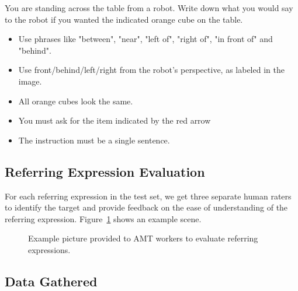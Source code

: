 \documentclass[letterpaper,10pt]{article}
\begin{document}
\begin{framed}
You are standing across the table from a robot. Write down what you would say to the robot if you wanted the indicated orange cube on the table.
\begin{itemize}[topsep=0pt,itemsep=-1ex,partopsep=1ex,parsep=1ex]
\item Use phrases like "between", "near", "left of", "right of", "in front of" and "behind".
\item Use front/behind/left/right from the robot's perspective, as labeled in the image. 
\item All orange cubes look the same.
\item You must ask for the item indicated by the red arrow
\item The instruction must be a single sentence.
\end{itemize}
\end{framed}

\subsection{Referring Expression Evaluation}

For each referring expression in the test set, we get three separate human raters to identify the target and provide feedback on the ease of understanding of the referring expression. Figure~\ref{fig:ref_expr_eval_pic} shows an example scene.

\begin{figure}[h!tb]
  \centering
  \caption{Example picture provided to AMT workers to evaluate referring expressions.}
  \label{fig:ref_expr_eval_pic}
\end{figure}

\subsection{Data Gathered}
\end{document}
